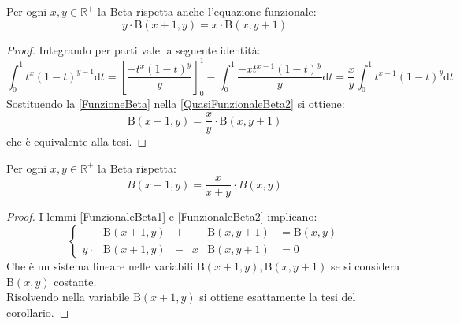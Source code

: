 \begin{lemma}\label{FunzionaleBeta2}
	Per ogni $x,y\in\mathbb{R^+}$ la Beta rispetta anche l'equazione funzionale:
	\begin{equation*}
		y\cdot\mathrm{B}(x+1,y)=x\cdot\mathrm{B}(x,y+1)
	\end{equation*}
\end{lemma}
\begin{proof}
	Integrando per parti vale la seguente identità:
	\begin{equation}\label{QuasiFunzionaleBeta2}
		\int_0^1 t^{x}(1-t)^{y-1}\mathrm{d}t=\left[\frac{-t^x(1-t)^y}y\right]_0^1-\int_0^1\frac{-xt^{x-1}(1-t)^y}{y}\mathrm{d}t=
		\frac xy \int_0^1 t^{x-1}(1-t)^y\mathrm{d}t 
	\end{equation}
	Sostituendo la \ref{FunzioneBeta} nella \ref{QuasiFunzionaleBeta2} si ottiene:
	\begin{equation*}
		\mathrm{B}(x+1,y)=\frac xy \cdot \mathrm{B}(x,y+1)
	\end{equation*}
	che è equivalente alla tesi.
\end{proof}


\begin{corollary}\label{FunzionaleBeta3}
	Per ogni $x,y\in\mathbb{R^+}$ la Beta rispetta:
	\begin{equation*}
		B(x+1,y)=\frac{x}{x+y}\cdot B(x,y)
	\end{equation*}
\end{corollary}
\begin{proof}
	I lemmi \ref{FunzionaleBeta1} e \ref{FunzionaleBeta2} implicano:
	\begin{equation}
		\left\{
		\begin{aligned}
			&\mathrm{B}(x+1,y) &+& &\mathrm{B}(x,y+1)  & =\mathrm{B}(x,y)\\
			y\cdot &\mathrm{B}(x+1,y) &-& x&\mathrm{B}(x,y+1) & =0
		\end{aligned}
		\right.
	\end{equation}
	Che è un sistema lineare nelle variabili $\mathrm{B}(x+1,y), \mathrm{B}(x,y+1)$ se si considera $\mathrm{B}(x,y)$ costante.\\
	Risolvendo nella variabile $\mathrm{B}(x+1,y)$ si ottiene esattamente la tesi del corollario.
\end{proof}




